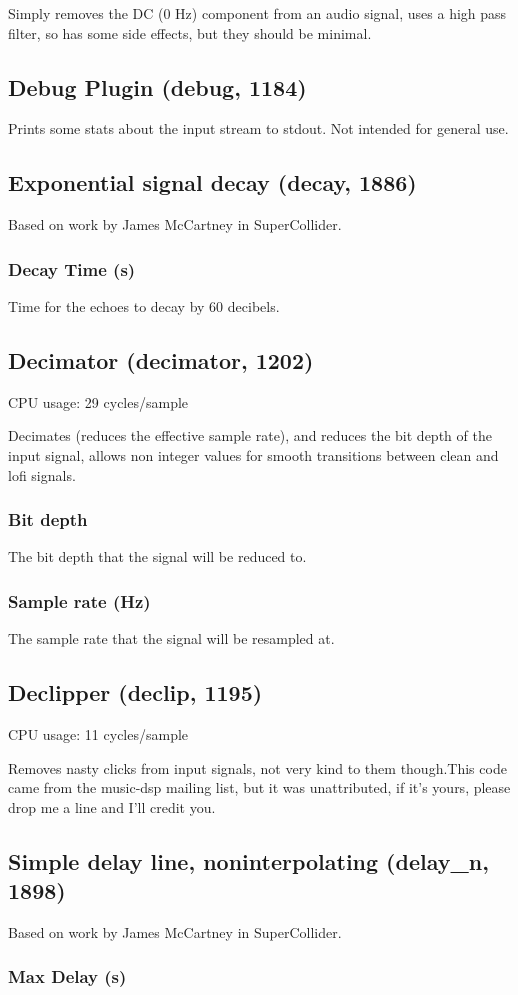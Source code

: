 \documentclass[11pt]{article}
\begin{document}
Simply removes the DC (0 Hz) component from an audio signal, uses a high pass filter, so has some side effects, but they should be minimal.\subsection{Debug Plugin (debug, 1184)\label{debug}\label{id1184}}
Prints some stats about the input stream to stdout. Not intended for general use.\subsection{Exponential signal decay (decay, 1886)\label{decay}\label{id1886}}
Based on work by James McCartney in SuperCollider.\subsubsection*{Decay Time (s)}

       Time for the echoes to decay by 60 decibels.
      \subsection{Decimator (decimator, 1202)\label{decimator}\label{id1202}}
CPU usage: 29 cycles/sample

Decimates (reduces the effective sample rate), and reduces the bit depth of the input signal, allows non integer values for smooth transitions between clean and lofi signals.\subsubsection*{Bit depth}
The bit depth that the signal will be reduced to.\subsubsection*{Sample rate (Hz)}
The sample rate that the signal will be resampled at.\subsection{Declipper (declip, 1195)\label{declip}\label{id1195}}
CPU usage: 11 cycles/sample

Removes nasty clicks from input signals, not very kind to them though.This code came from the music-dsp mailing list, but it was unattributed, if it's yours, please drop me a line and I'll credit you.\subsection{Simple delay line, noninterpolating (delay\_n, 1898)\label{delay_n}\label{id1898}}
Based on work by James McCartney in SuperCollider.\subsubsection*{Max Delay (s)}
\end{document}
